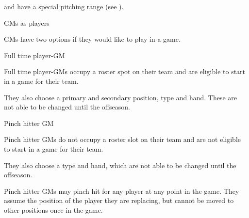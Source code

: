 \begin{deepEnumerate}
\begin{deepEnumerate}
\begin{deepEnumerate}
			and have a special pitching range (see ).
		\end{deepEnumerate}
		\item GMs as players
		\label{sec:GMs as Players}
		\begin{deepEnumerate}
			\item GMs have two options if they would like to play in a game.
			\begin{deepEnumerate}
				\item Full time player-GM
				\begin{deepEnumerate}
					\item Full time player-GMs occupy a roster spot on their team
					and are eligible to start in a game for their team.
					\item They also choose a primary and secondary position, type and hand.
					These are not able to be changed until the offseason.
				\end{deepEnumerate}
				\item Pinch hitter GM
				\begin{deepEnumerate}
					\item Pinch hitter GMs do not occupy a roster slot on their team
					and are not eligible to start in a game for their team.
					\item They also choose a type and hand,
					which are not able to be changed until the offseason.
					\item Pinch hitter GMs may pinch hit for any player at any point in the game.
					They assume the position of the player they are replacing,
					but cannot be moved to other positions once in the game.
				\end{deepEnumerate}
			\end{deepEnumerate}
		\end{deepEnumerate}
	\end{deepEnumerate}
\end{deepEnumerate}

